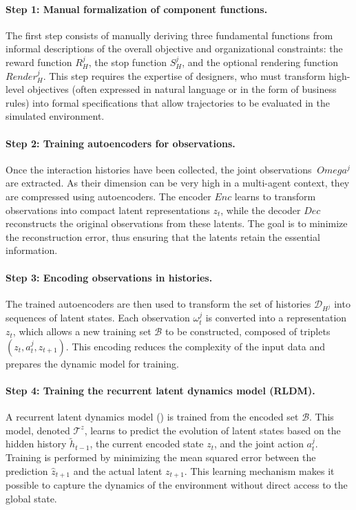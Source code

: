 \paragraph{Step 1: Manual formalization of component functions.}
The first step consists of manually deriving three fundamental functions from informal descriptions of the overall objective and organizational constraints: the reward function $R^j_H$, the stop function $S^j_H$, and the optional rendering function $Render^j_H$.
This step requires the expertise of designers, who must transform high-level objectives (often expressed in natural language or in the form of business rules) into formal specifications that allow trajectories to be evaluated in the simulated environment.

\paragraph{Step 2: Training autoencoders for observations.}
Once the interaction histories have been collected, the joint observations $\ Omega^j$ are extracted.
As their dimension can be very high in a multi-agent context, they are compressed using autoencoders.
The encoder $Enc$ learns to transform observations into compact latent representations $z_t$, while the decoder $Dec$ reconstructs the original observations from these latents.
The goal is to minimize the reconstruction error, thus ensuring that the latents retain the essential information.

\paragraph{Step 3: Encoding observations in histories.}
The trained autoencoders are then used to transform the set of histories $\mathcal{D}_{H^j}$ into sequences of latent states.
Each observation $\omega_t^j$ is converted into a representation $z_t$, which allows a new training set $\mathcal{B}$ to be constructed, composed of triplets $(z_t, a_t^j, z_{t+1})$.
This encoding reduces the complexity of the input data and prepares the dynamic model for training.

\paragraph{Step 4: Training the recurrent latent dynamics model (RLDM).}
A recurrent latent dynamics model () is trained from the encoded set $\mathcal{B}$.
This model, denoted $\mathcal{T}^z$, learns to predict the evolution of latent states based on the hidden history $\tilde{h}_{t-1}$, the current encoded state $z_t$, and the joint action $a_t^j$.
Training is performed by minimizing the mean squared error between the prediction $\hat {z}_{t+1}$ and the actual latent $z_{t+1}$.
This learning mechanism makes it possible to capture the dynamics of the environment without direct access to the global state.

